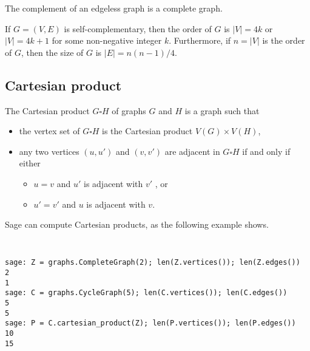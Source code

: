 \begin{theorem}
The complement of an edgeless graph is a complete graph.
\end{theorem}

\begin{theorem}
If $G = (V, E)$ is self-complementary, then the order of $G$ is
$|V| = 4k$ or $|V| = 4k + 1$ for some non-negative integer
$k$. Furthermore, if $n = |V|$ is the order of $G$, then the size of
$G$ is $|E| = n(n - 1) / 4$.
\end{theorem}



\subsection{Cartesian product}

The Cartesian product $G \square H$ of graphs $G$ and $H$ is a graph such that

\begin{itemize}
\item
 the vertex set of $G \square H$ is the Cartesian product $V(G) \times V(H)$,
\item
 any two vertices $(u,u')$ and $(v,v')$ are adjacent in $G \square H$
 if and only if either
\begin{itemize}
\item
 $ u = v$ and $u'$ is adjacent with $v'$ , or
 \item
$ u' = v'$ and $u$ is adjacent with $v$.
\end{itemize}
\end{itemize}

Sage can compute Cartesian products, as the following example shows.

%
\begin{center}
\fontsize{9pt}{9pt}
\selectfont
\tt
\begin{lstlisting}
sage: Z = graphs.CompleteGraph(2); len(Z.vertices()); len(Z.edges())
2
1
sage: C = graphs.CycleGraph(5); len(C.vertices()); len(C.edges())
5
5
sage: P = C.cartesian_product(Z); len(P.vertices()); len(P.edges())
10
15
\end{lstlisting}
\end{center}
%


